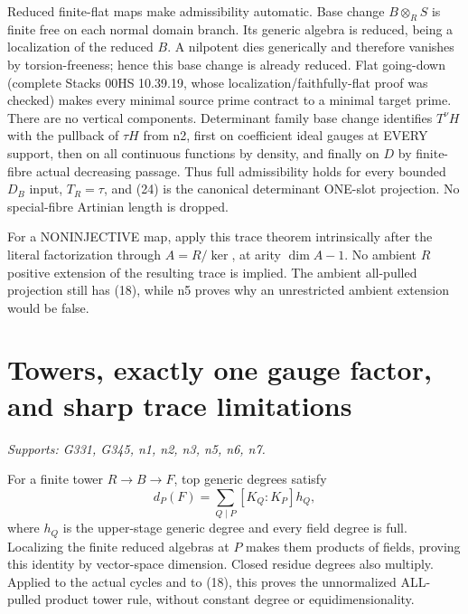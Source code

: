 \documentclass[11pt]{article}
\begin{document}
Reduced finite-flat maps make admissibility automatic. Base change $B\otimes_RS$ is finite free on each normal domain branch. Its generic algebra is reduced, being a localization of the reduced $B$. A nilpotent dies generically and therefore vanishes by torsion-freeness; hence this base change is already reduced. Flat going-down (complete Stacks 00HS 10.39.19, whose localization/faithfully-flat proof was checked) makes every minimal source prime contract to a minimal target prime. There are no vertical components. Determinant family base change identifies $T^\nu H$ with the pullback of $\tau H$ from n2, first on coefficient ideal gauges at EVERY support, then on all continuous functions by density, and finally on $D$ by finite-fibre actual decreasing passage. Thus full admissibility holds for every bounded $D_B$ input, $T_R=\tau$, and (24) is the canonical determinant ONE-slot projection. No special-fibre Artinian length is dropped.

For a NONINJECTIVE map, apply this trace theorem intrinsically after the literal factorization through $A=R/\ker$, at arity $\dim A-1$. No ambient $R$ positive extension of the resulting trace is implied. The ambient all-pulled projection still has (18), while n5 proves why an unrestricted ambient extension would be false.

\section{Towers, exactly one gauge factor, and sharp trace limitations}
\textit{Supports: G331, G345, n1, n2, n3, n5, n6, n7.}

For a finite tower $R\to B\to F$, top generic degrees satisfy
\[
d_P(F)=\sum_{Q\mid P}[K_Q:K_P]h_Q,
\]
where $h_Q$ is the upper-stage generic degree and every field degree is full. Localizing the finite reduced algebras at $P$ makes them products of fields, proving this identity by vector-space dimension. Closed residue degrees also multiply. Applied to the actual cycles and to (18), this proves the unnormalized ALL-pulled product tower rule, without constant degree or equidimensionality.
\end{document}
